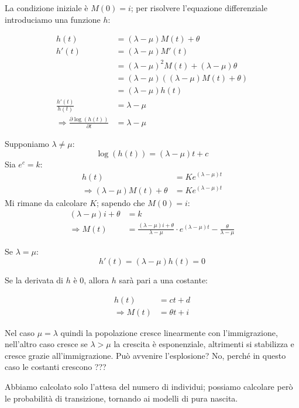 \documentclass[a4paper,12pt]{book}
\begin{document}
La condizione iniziale è $ M(0) = i $; per risolvere l'equazione differenziale introduciamo una funzione $ h $:

\begin{align*}
	h(t) & = (\lambda - \mu)M(t) + \theta \\
	h'(t) & = (\lambda - \mu)M'(t) \\
	& = (\lambda - \mu)^2 M(t) + (\lambda - \mu)\theta \\
	& = (\lambda - \mu)((\lambda - \mu)M(t) + \theta) \\
	& = (\lambda - \mu)h(t) \\
	\frac{h'(t)}{h(t)} & = \lambda - \mu \\
	\Rightarrow \frac{\partial \log(h(t))}{\partial t} & = \lambda - \mu
\end{align*}

Supponiamo $ \lambda \ne \mu $:
$$ \log(h(t)) = (\lambda - \mu)t + c $$
Sia $ e^c = k $:
\begin{align*}
	 h(t) & = K e^{(\lambda - \mu)t} \\
	 \Rightarrow (\lambda - \mu)M(t) + \theta & = Ke^{(\lambda - \mu)t}
\end{align*}
Mi rimane da calcolare $ K $; sapendo che $ M(0) = i$:
\begin{align*}
	(\lambda - \mu)i + \theta & = k \\
	\Rightarrow M(t) & = \frac{(\lambda - \mu)i + \theta}{\lambda - \mu} \cdot e^{(\lambda - \mu)t} - \frac{\theta}{\lambda - \mu}
\end{align*}

Se $ \lambda = \mu $:
$$ h'(t) = (\lambda - \mu)h(t) = 0 $$

Se la derivata di $ h $ è 0, allora $ h $ sarà pari a una costante:

\begin{align*}
	h(t) & = ct + d \\
	\Rightarrow M(t) & = \theta t + i
\end{align*}

Nel caso $\mu = \lambda$ quindi la popolazione cresce linearmente con l'immigrazione, nell'altro caso cresce se $ \lambda > \mu $ la crescita è esponenziale, altrimenti si stabilizza e cresce grazie all'immigrazione. Può avvenire l'esplosione? No, perché in questo caso le costanti crescono ??? %

Abbiamo calcolato solo l'attesa del numero di individui; possiamo calcolare però le probabilità di transizione, tornando ai modelli di pura nascita.
\end{document}
